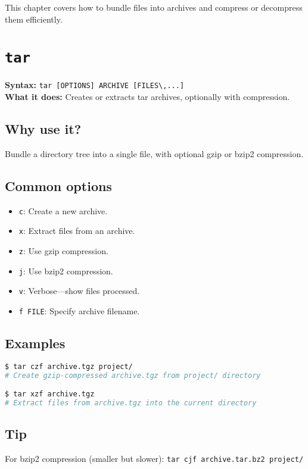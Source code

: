 \documentclass[10pt,oneside]{scrbook}
\begin{document}
This chapter covers how to bundle files into archives and compress or decompress them efficiently.

\section{\texttt{tar}}
\begin{cmdbox}
  \textbf{Syntax:} \lstinline!tar [OPTIONS] ARCHIVE [FILES\,...]! \\
  \textbf{What it does:} Creates or extracts tar archives, optionally with compression.
\end{cmdbox}
\begin{commanddetails}
  \subsection*{Why use it?}
    Bundle a directory tree into a single file, with optional gzip or bzip2 compression.

  \subsection*{Common options}
    \begin{itemize}
      \item \lstinline!c!: Create a new archive.  
      \item \lstinline!x!: Extract files from an archive.  
      \item \lstinline!z!: Use gzip compression.  
      \item \lstinline!j!: Use bzip2 compression.  
      \item \lstinline!v!: Verbose—show files processed.  
      \item \lstinline!f FILE!: Specify archive filename.
    \end{itemize}

  \subsection*{Examples}
  \begin{lstlisting}[language=bash]
$ tar czf archive.tgz project/
# Create gzip-compressed archive.tgz from project/ directory

$ tar xzf archive.tgz
# Extract files from archive.tgz into the current directory
  \end{lstlisting}

  \subsection*{Tip}
    For bzip2 compression (smaller but slower):  
    \lstinline!tar cjf archive.tar.bz2 project/!
\end{commanddetails}
\end{document}
